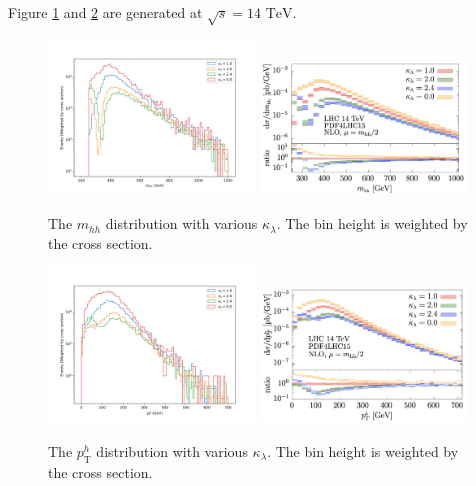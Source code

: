 \documentclass[12pt]{article}
\begin{document}
		Figure \ref{fig:di-Higgs-SM-kappa-mhh-14TeV} and \ref{fig:di-Higgs-SM-kappa-pth-14TeV} are generated at $\sqrt{s} = 14 \text{ TeV}$. 
		\begin{figure}[htpb]
			\centering
			\includegraphics[width=0.49\textwidth]{di-Higgs-SM-kappa-mhh-14TeV-my-data.png}
			\includegraphics[width=0.49\textwidth]{di-Higgs-SM-kappa-mhh-14TeV-ref.png}
			\caption{The $m_{hh}$ distribution with various $\kappa_\lambda$. The bin height is weighted by the cross section.}
			\label{fig:di-Higgs-SM-kappa-mhh-14TeV}
		\end{figure}
		\begin{figure}[htpb]
			\centering
			\includegraphics[width=0.49\textwidth]{di-Higgs-SM-kappa-pth-14TeV-my-data.png}
			\includegraphics[width=0.49\textwidth]{di-Higgs-SM-kappa-pth-14TeV-ref.png}
			\caption{The $p_\text{T}^{h}$ distribution with various $\kappa_\lambda$. The bin height is weighted by the cross section.}
			\label{fig:di-Higgs-SM-kappa-pth-14TeV}
		\end{figure}
\end{document}
